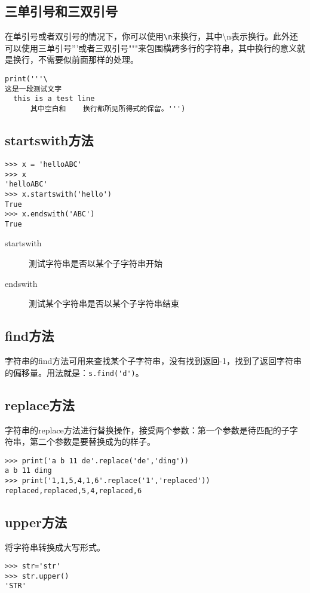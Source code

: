 \documentclass[12pt,oneside]{book}
\begin{document}
\begin{common-format}
\subsection{三单引号和三双引号}
在单引号或者双引号的情况下，你可以使用\verb+\n+来换行，其中\textbackslash n表示换行。此外还可以使用三单引号'''或者三双引号"""来包围横跨多行的字符串，其中换行的意义就是换行，不需要似前面那样的处理。

\begin{Verbatim}
print('''\
这是一段测试文字
  this is a test line
      其中空白和    换行都所见所得式的保留。''')
\end{Verbatim}


\subsection{startswith方法}
\begin{Verbatim}
>>> x = 'helloABC'
>>> x
'helloABC'
>>> x.startswith('hello')
True
>>> x.endswith('ABC')
True
\end{Verbatim}

\begin{description}
\item[startswith] 测试字符串是否以某个子字符串开始
\item[endswith] 测试某个字符串是否以某个子字符串结束
\end{description}


\subsection{find方法}
字符串的find方法可用来查找某个子字符串，没有找到返回-1，找到了返回字符串的偏移量。用法就是：\verb+s.find('d')+。


\subsection{replace方法}
字符串的replace方法进行替换操作，接受两个参数：第一个参数是待匹配的子字符串，第二个参数是要替换成为的样子。
\begin{Verbatim}
>>> print('a b 11 de'.replace('de','ding'))
a b 11 ding
>>> print('1,1,5,4,1,6'.replace('1','replaced'))
replaced,replaced,5,4,replaced,6
\end{Verbatim}




\subsection{upper方法}
将字符串转换成大写形式。
\begin{Verbatim}
>>> str='str'
>>> str.upper()
'STR'
\end{Verbatim}


\end{common-format}
\end{document}
